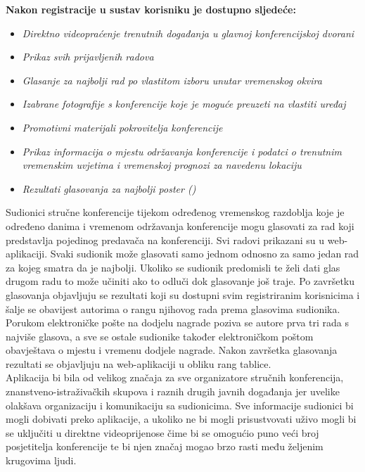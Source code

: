        \textbf{Nakon registracije u sustav korisniku je dostupno sljedeće:}
        \begin{itemize}
        	\item \textit{Direktno videopraćenje trenutnih događanja u glavnoj konferencijskoj dvorani}
        	\item \textit{Prikaz svih prijavljenih radova}
        	\item \textit{Glasanje za najbolji rad po vlastitom izboru unutar vremenskog okvira}
        	\item \textit{Izabrane fotografije s konferencije koje je moguće preuzeti na vlastiti uređaj}
        	\item \textit{Promotivni materijali pokrovitelja konferencije}
        	\item \textit{Prikaz informacija o mjestu održavanja konferencije i podatci o trenutnim vremenskim uvjetima i vremenskoj prognozi za navedenu lokaciju}
        	\item \textit{Rezultati glasovanja za najbolji poster ()}\\
        \end{itemize}

		Sudionici stručne konferencije tijekom određenog vremenskog razdoblja koje je određeno danima i vremenom održavanja konferencije mogu glasovati za rad koji predstavlja pojedinog predavača na konferenciji. Svi radovi prikazani su u web-aplikaciji. Svaki sudionik može glasovati samo jednom odnosno za samo jedan rad za kojeg smatra da je najbolji. Ukoliko se sudionik predomisli te želi dati glas drugom radu to može učiniti ako to odluči dok glasovanje još traje. Po završetku glasovanja objavljuju se rezultati koji su dostupni svim registriranim korisnicima i šalje se obavijest autorima o rangu njihovog rada prema glasovima sudionika. Porukom elektroničke pošte na dodjelu nagrade poziva se autore prva tri rada s najviše glasova, a sve se ostale sudionike također elektroničkom poštom obavještava o mjestu i vremenu dodjele nagrade. Nakon završetka glasovanja rezultati se objavljuju na web-aplikaciji u obliku rang tablice.\\
		
		Aplikacija bi bila od velikog značaja za sve organizatore stručnih konferencija, znanstveno-istraživačkih skupova i raznih drugih javnih događanja jer uvelike olakšava organizaciju i komunikaciju sa sudionicima. Sve informacije sudionici bi mogli dobivati preko aplikacije, a ukoliko ne bi mogli prisustvovati uživo mogli bi se uključiti u direktne videoprijenose čime bi se omogućio puno veći broj posjetitelja konferencije te bi njen značaj mogao brzo rasti među željenim krugovima ljudi.\\
		
